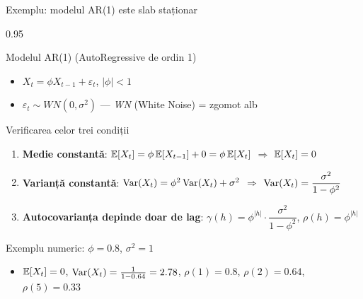 \documentclass[9pt, aspectratio=169, t]{beamer}
\begin{document}
\begin{frame}{Exemplu: modelul AR(1) este slab staționar}
    \begin{cminipage}{0.95\textwidth}
        \vspace{-0.2cm}
        {\footnotesize
        \begin{exampleblock}{Modelul AR(1) (AutoRegressive de ordin 1)}
            \begin{itemize}\setlength{\itemsep}{0pt}
                \item $X_t = \phi X_{t-1} + \varepsilon_t$, \quad $|\phi| < 1$
                \item $\varepsilon_t \sim WN(0, \sigma^2)$ --- \textit{WN} (White Noise) = zgomot alb
            \end{itemize}
        \end{exampleblock}
        \vspace{-2mm}
        \begin{block}{Verificarea celor trei condiții}
            \begin{enumerate}\setlength{\itemsep}{1pt}
                \item \textbf{Medie constantă}: $\mathbb{E}[X_t] = \phi\,\mathbb{E}[X_{t-1}] + 0 = \phi\,\mathbb{E}[X_t]$ \;\; $\Rightarrow$ \;\; $\mathbb{E}[X_t] = 0$
                \item \textbf{Varianță constantă}: $\text{Var}(X_t) = \phi^2\,\text{Var}(X_t) + \sigma^2$ \;\; $\Rightarrow$ \;\; $\text{Var}(X_t) = \dfrac{\sigma^2}{1 - \phi^2}$
                \item \textbf{Autocovarianța depinde doar de lag}:
                    $\gamma(h) = \phi^{|h|} \cdot \dfrac{\sigma^2}{1 - \phi^2}$, \quad
                    $\rho(h) = \phi^{|h|}$
            \end{enumerate}
        \end{block}
        \vspace{-2mm}
        \begin{exampleblock}{Exemplu numeric: $\phi = 0.8$, $\sigma^2 = 1$}
            \begin{itemize}\setlength{\itemsep}{0pt}
                \item $\mathbb{E}[X_t] = 0$, \quad $\text{Var}(X_t) = \frac{1}{1-0.64} = 2.78$, \quad $\rho(1) = 0.8$, \; $\rho(2) = 0.64$, \; $\rho(5) = 0.33$
            \end{itemize}
        \end{exampleblock}
        }
    \end{cminipage}
\end{frame}
\end{document}

